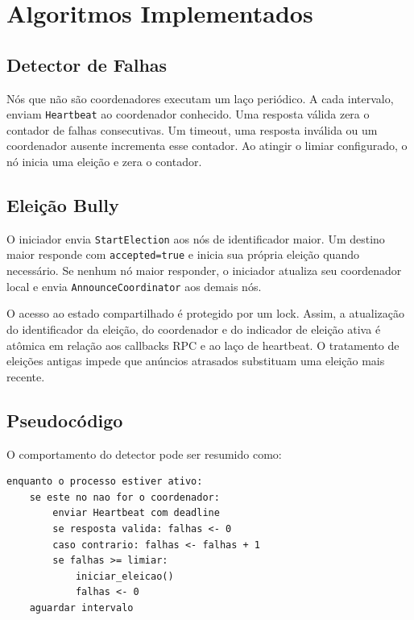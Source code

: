 \section{Algoritmos Implementados}
\label{sec:algoritmos}

\subsection{Detector de Falhas}

Nós que não são coordenadores executam um laço periódico. A cada intervalo,
enviam \texttt{Heartbeat} ao coordenador conhecido. Uma resposta válida zera o
contador de falhas consecutivas. Um timeout, uma resposta inválida ou um
coordenador ausente incrementa esse contador. Ao atingir o limiar configurado,
o nó inicia uma eleição e zera o contador.

\subsection{Eleição Bully}

O iniciador envia \texttt{StartElection} aos nós de identificador maior. Um
destino maior responde com \texttt{accepted=true} e inicia sua própria eleição
quando necessário. Se nenhum nó maior responder, o iniciador atualiza seu
coordenador local e envia \texttt{AnnounceCoordinator} aos demais nós.

O acesso ao estado compartilhado é protegido por um lock. Assim, a atualização
do identificador da eleição, do coordenador e do indicador de eleição ativa é
atômica em relação aos callbacks RPC e ao laço de heartbeat. O tratamento de
eleições antigas impede que anúncios atrasados substituam uma eleição mais
recente.

\subsection{Pseudocódigo}

O comportamento do detector pode ser resumido como:
\par\medskip
\par\smallskip
\begin{lstlisting}[language={}]
enquanto o processo estiver ativo:
    se este no nao for o coordenador:
        enviar Heartbeat com deadline
        se resposta valida: falhas <- 0
        caso contrario: falhas <- falhas + 1
        se falhas >= limiar:
            iniciar_eleicao()
            falhas <- 0
    aguardar intervalo
\end{lstlisting}

